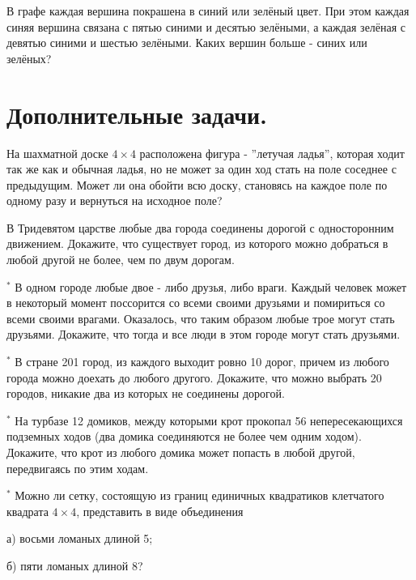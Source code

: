\begin{thm}
    В графе каждая вершина покрашена в синий или зелёный цвет. При этом каждая синяя вершина связана с пятью синими и десятью зелёными, а каждая зелёная с девятью синими и шестью зелёными. Каких вершин больше - синих или зелёных?
\end{thm}

\newpage

\section{Дополнительные задачи.}

\begin{thm}
    На шахматной доске $4 \times 4$ расположена фигура - ''летучая ладья'', которая ходит так же как и обычная ладья, но не может за один ход стать на поле соседнее с предыдущим. Может ли она обойти всю доску, становясь на каждое поле по одному разу и вернуться на исходное поле?
\end{thm}

\begin{thm}
    В Тридевятом царстве любые два города соединены дорогой с односторонним движением. Докажите, что существует город, из которого можно добраться в любой другой не более, чем по двум дорогам.
\end{thm}

\begin{thm} $^*$
    В одном городе любые двое - либо друзья, либо враги. Каждый человек может в некоторый момент поссорится со всеми своими друзьями и помириться со всеми своими врагами. Оказалось, что таким образом любые трое могут стать друзьями. Докажите, что тогда и все люди в этом городе могут стать друзьями.
\end{thm}

\begin{thm} $^*$
    В стране 201 город, из каждого выходит ровно 10 дорог, причем из любого города можно доехать до любого другого. Докажите, что можно выбрать 20 городов, никакие два из которых не соединены дорогой.
\end{thm}

\begin{thm} $^*$
    На турбазе 12 домиков, между которыми крот прокопал 56 непересекающихся подземных ходов (два домика соединяются не более чем одним ходом). Докажите, что крот из любого домика может попасть в любой другой, передвигаясь по этим ходам.
\end{thm}

\begin{thm} $^*$
    Можно ли сетку, состоящую из границ единичных квадратиков клетчатого квадрата $4 \times 4$, представить в виде объединения 
    \par
    а) восьми ломаных длиной 5;
    \par
    б) пяти ломаных длиной 8?
\end{thm}